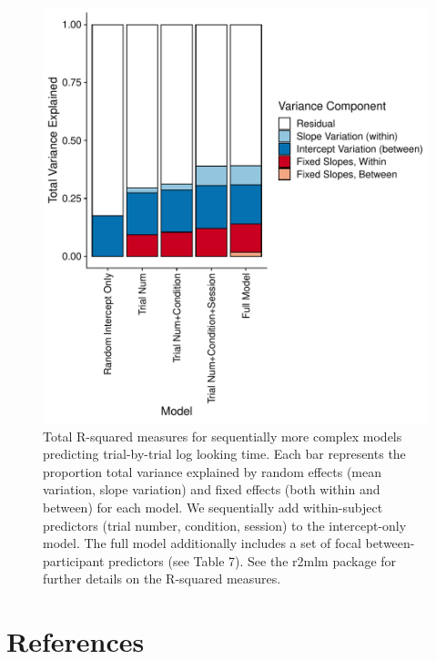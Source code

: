 \documentclass[
  english,
  man, donotrepeattitle,floatsintext]{apa6}
\begin{document}
\begin{figure}

{\centering \includegraphics{MB1T_supplement_files/figure-latex/fig16-1} 

}

\caption{Total R-squared measures for sequentially more complex models predicting trial-by-trial log looking time. Each bar represents the proportion total variance explained by random effects (mean variation, slope variation) and fixed effects (both within and between) for each model. We sequentially add within-subject predictors (trial number, condition, session) to the intercept-only model. The full model additionally includes a set of focal between-participant predictors (see Table 7). See the r2mlm package for further details on the R-squared measures.}\label{fig:fig16}
\end{figure}

\newpage

\hypertarget{references}{%
\section{References}\label{references}}

\begingroup
\setlength{\parindent}{-0.5in}
\setlength{\leftskip}{0.5in}
\end{document}
